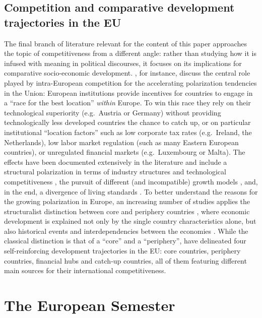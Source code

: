 \documentclass[
]{article}
\begin{document}
\hypertarget{subsec:polar}{%
\subsection{Competition and comparative development trajectories in the EU}\label{subsec:polar}}

The final branch of literature relevant for the content of this paper approaches
the topic of competitiveness from a different angle: rather than studying how
it is infused with meaning in political discourses, it focuses on its implications
for comparative socio-economic development. \citet{Kapeller:2019cds}, for instance,
discuss the central role played by intra-European competition for the accelerating
polarization tendencies in the Union: European institutions provide incentives
for countries to engage in a \enquote{race for the best location} \emph{within} Europe.
To win this race they rely on their technological superiority
(e.g.~Austria or Germany) without providing technologically less developed
countries the chance to catch up, or on particular institutional
\enquote{location factors} such as low corporate tax rates (e.g.~Ireland, the Netherlands),
low labor market regulation (such as many Eastern European countries), or
unregulated financial markets (e.g.~Luxembourg or Malta).
The effects have been documented extensively in the literature and include a
structural polarization in terms of industry structures and technological
competitiveness \citep[e.g.][]{Simonazzi.2013, Storm.2015jsi, Graebner.2020u},
the pursuit of different (and incompatible) growth models
\citep[e.g.][]{Baccaro.2016, Graebner.2020u}, and,
in the end, a divergence of living standards \citep[e.g.][]{Kapeller:2019cds}.
To better understand the reasons for the growing polarization in Europe,
an increasing number of studies applies the structuralist distinction between
core and periphery countries
\citep[e.g.][]{Simonazzi.2013, Celi:2018},
where economic development is explained not only by the single country
characteristics alone, but also historical events and interdependencies between
the economies \citep[for methodological remarks see][]{Graebner:2020struc}.
While the classical distinction is that of a \enquote{core} and a \enquote{periphery},
\citet{Graebner:2020jee} have delineated four self-reinforcing development
trajectories in the EU: core countries, periphery countries, financial hubs and
catch-up countries, all of them featuring different main sources for their
international competitiveness.

\hypertarget{sec:semester}{%
\section{The European Semester}\label{sec:semester}}
\end{document}
